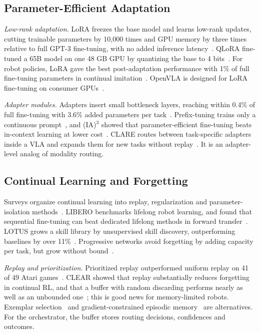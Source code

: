\documentclass[journal]{IEEEtran}
\begin{document}
\subsection{Parameter-Efficient Adaptation}\label{sec:peft}
\textit{Low-rank adaptation.} LoRA freezes the base model and learns low-rank updates, cutting trainable parameters by 10,000 times and GPU memory by three times relative to full GPT-3 fine-tuning, with no added inference latency~\cite{Hu2022}. QLoRA fine-tuned a 65B model on one 48 GB GPU by quantizing the base to 4 bits~\cite{Dettmers2023}. For robot policies, LoRA gave the best post-adaptation performance with 1\% of full fine-tuning parameters in continual imitation~\cite{Liu2024b}. OpenVLA is designed for LoRA fine-tuning on consumer GPUs~\cite{Kim2024}.

\textit{Adapter modules.} Adapters insert small bottleneck layers, reaching within 0.4\% of full fine-tuning with 3.6\% added parameters per task~\cite{Houlsby2019}. Prefix-tuning trains only a continuous prompt~\cite{Li2021}, and (IA)\ensuremath{^3} showed that parameter-efficient fine-tuning beats in-context learning at lower cost~\cite{Liu2022}. CLARE routes between task-specific adapters inside a VLA and expands them for new tasks without replay~\cite{Romer2026b}. It is an adapter-level analog of modality routing.


\subsection{Continual Learning and Forgetting}\label{sec:continual}
Surveys organize continual learning into replay, regularization and parameter-isolation methods~\cite{DeLange2022}. LIBERO benchmarks lifelong robot learning, and found that sequential fine-tuning can beat dedicated lifelong methods in forward transfer~\cite{Liu2023b}. LOTUS grows a skill library by unsupervised skill discovery, outperforming baselines by over 11\%~\cite{Wan2024}. Progressive networks avoid forgetting by adding capacity per task, but grow without bound~\cite{Rusu2016}.

\textit{Replay and prioritization.} Prioritized replay outperformed uniform replay on 41 of 49 Atari games~\cite{Schaul2016}. CLEAR showed that replay substantially reduces forgetting in continual RL, and that a buffer with random discarding performs nearly as well as an unbounded one~\cite{Rolnick2019}; this is good news for memory-limited robots. Exemplar selection~\cite{Rebuffi2017} and gradient-constrained episodic memory~\cite{LopezPaz2017} are alternatives. For the orchestrator, the buffer stores routing decisions, confidences and outcomes.
\end{document}
